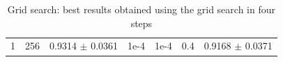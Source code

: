 \documentclass[11pt]{article}
\begin{document}
\begin{table}[ht]
{\begin{tabular}{c|c|c||c|c|c|c}
                1 & 256 & 0.9314 $\pm$ 0.0361 &
                1e-4  & 1e-4 & 0.4 & 0.9168 $\pm$ 0.0371 \\
                
                
                
                

                
                
            \end{tabular}
            }
            \caption{Grid search: best results obtained using the grid search in four steps}
            \label{grid-search}
        \end{table}
\end{document}
